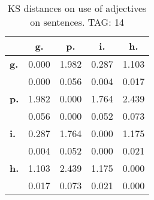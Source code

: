 \begin{table}[h!]
\begin{center}
\begin{tabular}{| l || c | c | c | c |}\hline
 & {\bf g.} & {\bf p.} & {\bf i.} & {\bf h.} \\\hline\hline
{\bf g.} & 0.000 & 1.982 & 0.287 & 1.103 \\
{\bf } & 0.000 & 0.056 & 0.004 & 0.017 \\\hline
{\bf p.} & 1.982 & 0.000 & 1.764 & 2.439 \\
{\bf } & 0.056 & 0.000 & 0.052 & 0.073 \\\hline
{\bf i.} & 0.287 & 1.764 & 0.000 & 1.175 \\
{\bf } & 0.004 & 0.052 & 0.000 & 0.021 \\\hline
{\bf h.} & 1.103 & 2.439 & 1.175 & 0.000 \\
{\bf } & 0.017 & 0.073 & 0.021 & 0.000 \\\hline
\end{tabular}
\caption{KS distances on use of adjectives on sentences. TAG: 14}
\end{center}
\end{table}